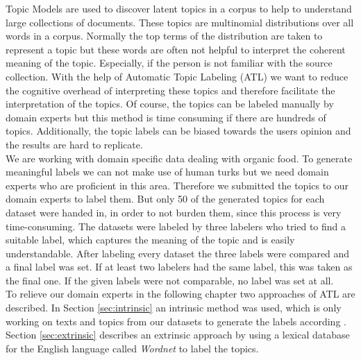 Topic Models are used to discover latent topics in a corpus to help to understand large collections of documents. These topics are multinomial distributions over all words in a corpus. Normally the top terms of the distribution are taken to represent a topic but these words are often not helpful to interpret the coherent meaning of the topic. Especially, if the person is not familiar with the source collection.
With the help of Automatic Topic Labeling (\ac{ATL}) we want to reduce the cognitive overhead of interpreting these topics and therefore facilitate the interpretation of the topics.
Of course, the topics can be labeled manually by domain experts but this method is time consuming if there are hundreds of topics. Additionally, the topic labels can be biased towards the users opinion and the results are hard to replicate. \\
We are working with domain specific data dealing with organic food. To generate meaningful labels we can not make use of human turks but we need domain experts who are proficient in this area. Therefore we submitted the topics to our domain experts to label them. But only 50 of the generated topics for each dataset were handed in, in order to not burden them, since this process is very time-consuming. The datasets were labeled by three labelers who tried to find a suitable label, which captures the meaning of the topic and is easily understandable. After labeling every dataset the three labels were compared and a final label was set. If at least two labelers had the same label, this was taken as the final one. If the given labels were not comparable, no label was set at all. \\
To relieve our domain experts in the following chapter two approaches of \ac{ATL} are described. In Section \ref{sec:intrinsic} an intrinsic method was used, which is only working on texts and topics from our datasets to generate the labels according \cite{Mei2007}. Section \ref{sec:extrinsic} describes an extrinsic approach by using a lexical database for the English language called \textit{Wordnet} to label the topics.
 


